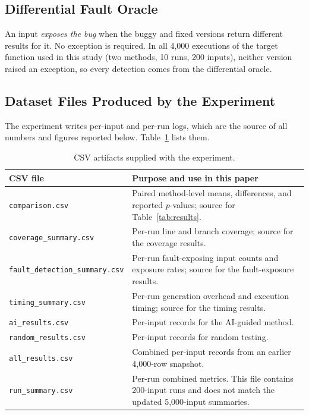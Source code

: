 \documentclass[12pt,onecolumn]{IEEEtran}
\begin{document}
\subsection{Differential Fault Oracle}

An input \emph{exposes the bug} when the buggy and fixed versions return different results for it. No exception is required. In all 4,000 executions of the target function used in this study (two methods, 10 runs, 200 inputs), neither version raised an exception, so every detection comes from the differential oracle.

\subsection{Dataset Files Produced by the Experiment}

The experiment writes per-input and per-run logs, which are the source of all numbers and figures reported below. Table~\ref{tab:files} lists them.

\begin{table}[htbp]
\centering
\caption{CSV artifacts supplied with the experiment.}
\label{tab:files}
\small
\renewcommand{\arraystretch}{1.15}
\begin{tabularx}{\textwidth}{@{}>{\raggedright\arraybackslash}p{}>{\raggedright\arraybackslash}X@{}}
\toprule
\textbf{CSV file} & \textbf{Purpose and use in this paper}\\
\midrule
\texttt{comparison.csv} & Paired method-level means, differences, and reported $p$-values; source for Table~\ref{tab:results}.\\
\texttt{coverage\_summary.csv} & Per-run line and branch coverage; source for the coverage results.\\
\texttt{fault\_detection\_summary.csv} & Per-run fault-exposing input counts and exposure rates; source for the fault-exposure results.\\
\texttt{timing\_summary.csv} & Per-run generation overhead and execution timing; source for the timing results.\\
\texttt{ai\_results.csv} & Per-input records for the AI-guided method.\\
\texttt{random\_results.csv} & Per-input records for random testing.\\
\texttt{all\_results.csv} & Combined per-input records from an earlier 4,000-row snapshot.\\
\texttt{run\_summary.csv} & Per-run combined metrics. This file contains 200-input runs and does not match the updated 5,000-input summaries.\\
\bottomrule
\end{tabularx}
\end{table}
\end{document}
